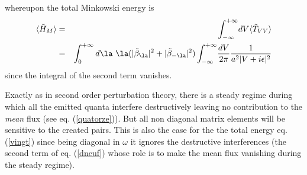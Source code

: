 \documentclass[12pt]{article}
\begin{document}
whereupon the total Minkowski energy is
\begin{eqnarray}
\bk{\tilde H_M} &=&  \int_{-\infty}^{+\infty} \! dV
\bk{\tilde T_{VV}}
\nonumber\\ &=&  \int_{0}^{+\infty}  d\la\ \la (|
 \tilde \beta_{\la}|^2 +| \tilde \beta_{- \la}|^2)
  \int_{-\infty}^{+\infty} \! {dV \over 2 \pi} {1 \over a^2 |V+i
\epsilon|^2 }
\label{vingt}
\end{eqnarray}
since the integral of the second term vanishes.

Exactly as in second order perturbation theory,
there is a steady regime during which all the emitted quanta interfere
destructively
leaving no contribution to the
{\it
mean
}
flux (see eq. (\ref{quatorze})). But all non diagonal matrix
elements will be sensitive to the
created pairs. This is also the case for the
the total energy eq. (\ref{vingt}) since being diagonal in
$ \omega$
it ignores the destructive interferences (the second term of eq.
(\ref{dneuf}) whose role is to make the mean flux vanishing during the steady
regime).
\end{document}
